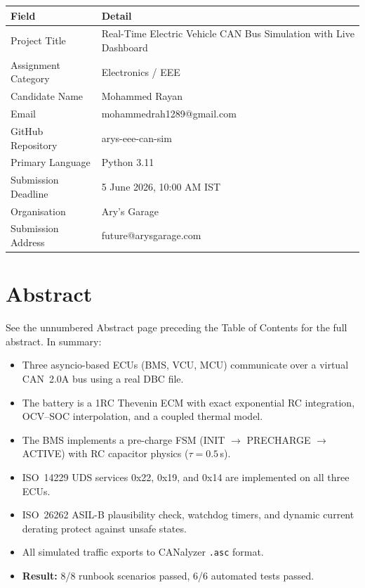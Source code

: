 \documentclass[12pt, a4paper, openany]{report}
\newcommand{\code}[1]{\texttt{#1}}
\begin{document}
\begin{center}
\begin{tabularx}{0.88\textwidth}{lX}
  \toprule
  \rowcolor{TblHead}
  \color{white}\textbf{Field} &
  \color{white}\textbf{Detail} \\
  \midrule
  Project Title       & Real-Time Electric Vehicle CAN Bus Simulation with Live Dashboard \\
  \rowcolor{TblAlt}
  Assignment Category & Electronics / EEE \\
  Candidate Name      & Mohammed Rayan \\
  \rowcolor{TblAlt}
  Email               & mohammedrah1289@gmail.com \\
  GitHub Repository   & arys-eee-can-sim \\
  \rowcolor{TblAlt}
  Primary Language    & Python 3.11 \\
  Submission Deadline & 5 June 2026, 10:00 AM IST \\
  \rowcolor{TblAlt}
  Organisation        & Ary's Garage \\
  Submission Address  & future@arysgarage.com \\
  \bottomrule
\end{tabularx}
\end{center}

\chapter{Abstract}

See the unnumbered Abstract page preceding the Table of Contents for the
full abstract. In summary:

\begin{itemize}[leftmargin=1.5em]
  \item Three asyncio-based ECUs (BMS, VCU, MCU) communicate over a virtual
        CAN~2.0A bus using a real DBC file.
  \item The battery is a 1RC Thevenin ECM with exact exponential RC
        integration, OCV--SOC interpolation, and a coupled thermal model.
  \item The BMS implements a pre-charge FSM (INIT $\to$ PRECHARGE $\to$
        ACTIVE) with RC capacitor physics ($\tau = 0.5$\,s).
  \item ISO~14229 UDS services 0x22, 0x19, and 0x14 are implemented on all
        three ECUs.
  \item ISO~26262 ASIL-B plausibility check, watchdog timers, and dynamic
        current derating protect against unsafe states.
  \item All simulated traffic exports to CANalyzer \code{.asc} format.
  \item \textbf{Result:} 8/8 runbook scenarios passed, 6/6 automated tests
        passed.
\end{itemize}
\end{document}
